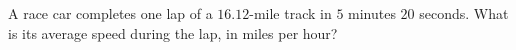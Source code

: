 A race car completes one lap of a $16.12$-mile track in $5$ minutes $20$ seconds. What is its average speed during the lap, in miles per hour?
